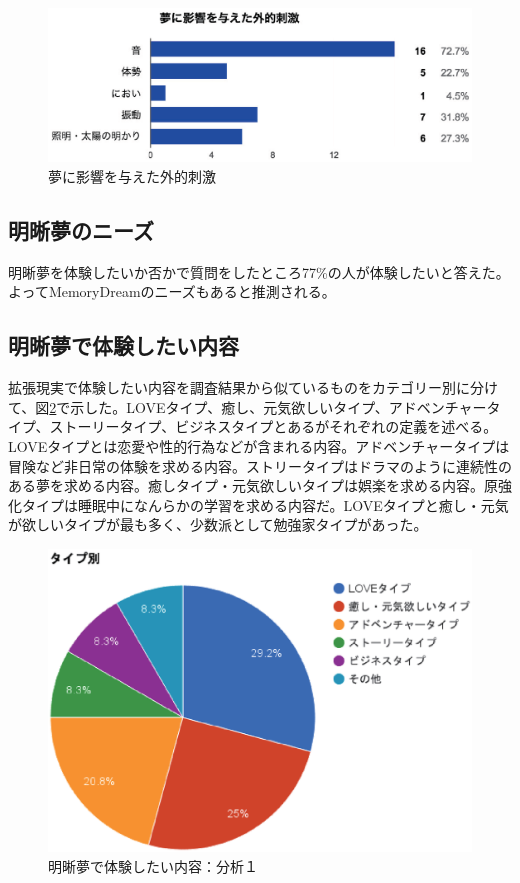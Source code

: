 \begin{figure}[htbp]
\begin{center}
\includegraphics[width=15cm]{eps/input.eps}
\caption{夢に影響を与えた外的刺激}
\label{externalShigeki}
\end{center}
\end{figure}

\subsection{明晰夢のニーズ}
明晰夢を体験したいか否かで質問をしたところ77\%の人が体験したいと答えた。よってMemoryDreamのニーズもあると推測される。

\subsection{明晰夢で体験したい内容}
拡張現実で体験したい内容を調査結果から似ているものをカテゴリー別に分けて、図\ref{desiredDreamTpye}で示した。LOVEタイプ、癒し、元気欲しいタイプ、アドベンチャータイプ、ストーリータイプ、ビジネスタイプとあるがそれぞれの定義を述べる。LOVEタイプとは恋愛や性的行為などが含まれる内容。アドベンチャータイプは冒険など非日常の体験を求める内容。ストリータイプはドラマのように連続性のある夢を求める内容。癒しタイプ・元気欲しいタイプは娯楽を求める内容。原強化タイプは睡眠中になんらかの学習を求める内容だ。LOVEタイプと癒し・元気が欲しいタイプが最も多く、少数派として勉強家タイプがあった。

\begin{figure}[htbp]
\begin{center}
\includegraphics[width=15cm]{eps/dreamType.eps}
\caption{明晰夢で体験したい内容：分析１}
\label{desiredDreamTpye}
\end{center}
\end{figure}

